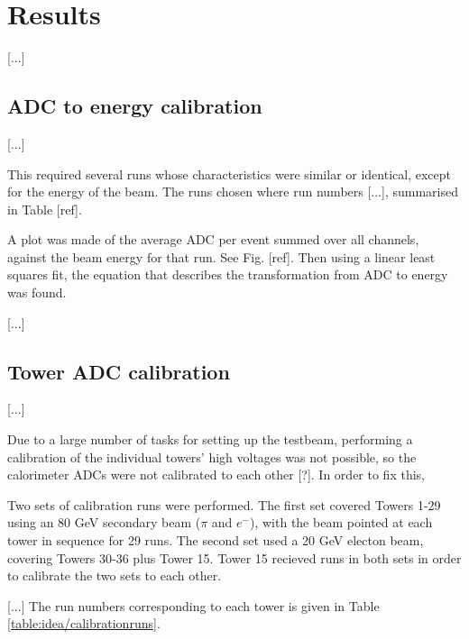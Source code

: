 \section{Results}
[...]

\subsection{ADC to energy calibration}
[...]

This required several runs whose characteristics were similar or identical, except for the energy of the beam. The runs chosen where run numbers [...], summarised in Table [ref].

A plot was made of the average \acrshort{ADC} per event summed over all channels, against the beam energy for that run. See Fig. [ref]. Then using a linear least squares fit, the equation that describes the transformation from ADC to energy was found.

[...]

\subsection{Tower ADC calibration}
[...]

Due to a large number of tasks for setting up the testbeam, performing a calibration of the individual towers' high voltages was not possible, so the calorimeter ADCs were not calibrated to each other [?]. In order to fix this, 

Two sets of calibration runs were performed. The first set covered Towers 1-29 using an 80 GeV secondary beam ($\pi$ and $e^{-}$), with the beam pointed at each tower in sequence for 29 runs. The second set used a 20 GeV electon beam, covering Towers 30-36 plus Tower 15. Tower 15 recieved runs in both sets in order to calibrate the two sets to each other. 

[...] The run numbers corresponding to each tower is given in Table \ref{table:idea/calibrationruns}.

